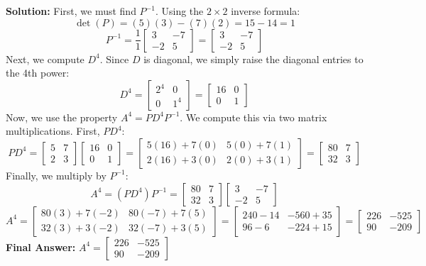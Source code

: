 \documentclass[11pt, a4paper]{article}
\theoremstyle{definition}
\theoremstyle{remark}
\begin{document}
\textbf{Solution:}
First, we must find $P^{-1}$. Using the $2 \times 2$ inverse formula:
\[
\det(P) = (5)(3) - (7)(2) = 15 - 14 = 1
\]
\[
P^{-1} = \frac{1}{1} \begin{bmatrix} 3 & -7 \\ -2 & 5 \end{bmatrix} = \begin{bmatrix} 3 & -7 \\ -2 & 5 \end{bmatrix}
\]
Next, we compute $D^4$. Since $D$ is diagonal, we simply raise the diagonal entries to the 4th power:
\[
D^4 = \begin{bmatrix} 2^4 & 0 \\ 0 & 1^4 \end{bmatrix} = \begin{bmatrix} 16 & 0 \\ 0 & 1 \end{bmatrix}
\]
Now, we use the property $A^4 = PD^4P^{-1}$. We compute this via two matrix multiplications. First, $PD^4$:
\[
PD^4 = \begin{bmatrix} 5 & 7 \\ 2 & 3 \end{bmatrix} \begin{bmatrix} 16 & 0 \\ 0 & 1 \end{bmatrix} = \begin{bmatrix} 5(16) + 7(0) & 5(0) + 7(1) \\ 2(16) + 3(0) & 2(0) + 3(1) \end{bmatrix} = \begin{bmatrix} 80 & 7 \\ 32 & 3 \end{bmatrix}
\]
Finally, we multiply by $P^{-1}$:
\[
A^4 = (PD^4)P^{-1} = \begin{bmatrix} 80 & 7 \\ 32 & 3 \end{bmatrix} \begin{bmatrix} 3 & -7 \\ -2 & 5 \end{bmatrix}
\]
\[
A^4 = \begin{bmatrix} 80(3) + 7(-2) & 80(-7) + 7(5) \\ 32(3) + 3(-2) & 32(-7) + 3(5) \end{bmatrix} = \begin{bmatrix} 240 - 14 & -560 + 35 \\ 96 - 6 & -224 + 15 \end{bmatrix} = \begin{bmatrix} 226 & -525 \\ 90 & -209 \end{bmatrix}
\]
\textbf{Final Answer:} $\displaystyle A^4 = \begin{bmatrix} 226 & -525 \\ 90 & -209 \end{bmatrix}$
\end{document}
